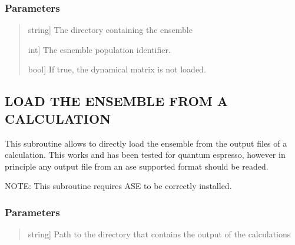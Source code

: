 \documentclass[a4paper,11pt,english]{sphinxmanual}
\begin{document}
\begin{fulllineitems}
\begin{fulllineitems}
\subsubsection{Parameters}
\label{\detokenize{apireference:id18}}\begin{quote}
\begin{description}
\sphinxlineitem{data\_dir}{[}string{]}
\sphinxAtStartPar
The directory containing the ensemble

\sphinxlineitem{population\_id}{[}int{]}
\sphinxAtStartPar
The esnemble population identifier.

\sphinxlineitem{avoid\_loading\_dyn}{[}bool{]}
\sphinxAtStartPar
If true, the dynamical matrix is not loaded.

\end{description}
\end{quote}

\end{fulllineitems}


\begin{fulllineitems}
\label{\detokenize{apireference:sscha.Ensemble.Ensemble.load_from_calculator_output}}
\pysigstartsignatures
{}
\pysigstopsignatures

\subsection{LOAD THE ENSEMBLE FROM A CALCULATION}
\label{\detokenize{apireference:load-the-ensemble-from-a-calculation}}
\sphinxAtStartPar
This subroutine allows to directly load the ensemble from the output files
of a calculation. This works and has been tested for quantum espresso,
however in principle any output file from an ase supported format
should be readed.

\sphinxAtStartPar
NOTE: This subroutine requires ASE to be correctly installed.


\subsubsection{Parameters}
\label{\detokenize{apireference:id19}}\begin{quote}
\begin{description}
\sphinxlineitem{directory}{[}string{]}
\sphinxAtStartPar
Path to the directory that contains the output of the calculations


\end{description}
\end{quote}
\end{fulllineitems}
\end{fulllineitems}
\end{document}

